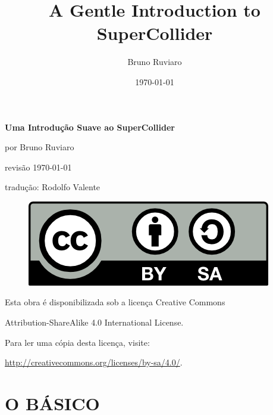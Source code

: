 \documentclass[11pt]{article}
\title{\textbf{A Gentle Introduction to SuperCollider}}
\author{Bruno Ruviaro}
\date{\today}
\begin{document}
\vspace*{\fill}
\begin{center}
{\LARGE \textbf{Uma Introdução Suave ao SuperCollider}}

\bigskip
por Bruno Ruviaro

\medskip
revisão \today

tradução: Rodolfo Valente


\bigskip
\bigskip

\begin{figure}[h]
\begin{center}
\includegraphics[scale=1]{fig-by-sa.png}
\end{center}
\end{figure}

\bigskip
Esta obra é disponibilizada sob a licença Creative Commons

Attribution-ShareAlike 4.0 International License.

Para ler uma cópia desta licença, visite:

\url{http://creativecommons.org/licenses/by-sa/4.0/}.



\end{center}
\vspace*{\fill}
\thispagestyle{empty}
\clearpage

\tableofcontents
\maketitle
{}


\part{O BÁSICO}












\newpage
\end{document}
